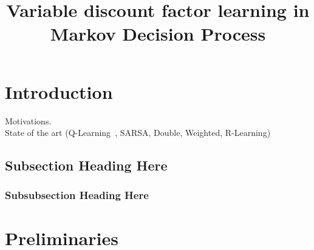 \documentclass[conference]{IEEEtran}
\begin{document}
\title{Variable discount factor learning in Markov Decision Process}


\author{
}


\maketitle

\begin{abstract}

\end{abstract}



%
\IEEEpeerreviewmaketitle



\section{Introduction}
Motivations. \\

State of the art (Q-Learning~\cite{watkins1992q}, SARSA, Double, Weighted, R-Learning)


\subsection{Subsection Heading Here}

\subsubsection{Subsubsection Heading Here}

\section{Preliminaries}
\end{document}
